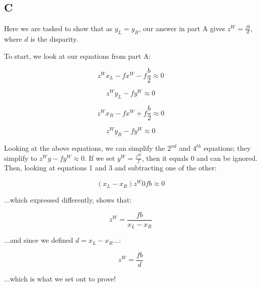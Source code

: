 \documentclass{article}
\begin{document}
\subsection*{C}

Here we are tasked to show that as $y_L=y_R$, our answer in part A gives $z^W=\frac{fb}{d}$, where $d$ is the disparity.

\noindent To start, we look at our equations from part A:

\begin{equation}
    z^W x_L - f x^W - f \frac{b}{2} \approx 0
\end{equation}

\begin{equation}
    z^W y_L - f y^W \approx 0
\end{equation}

\begin{equation}
    z^W x_R - f x^W + f \frac{b}{2} \approx 0
\end{equation}

\begin{equation}
    z^W y_R - f y^W \approx 0
\end{equation}

Looking at the above equations, we can simplify the $2^{nd}$ and $4^{th}$ equations; they simplify to $z^Wy - fy^W \approx 0$. If we set $y^W = \frac{z^W}{f}$, then it equals $0$ and can be ignored. Then, looking at equations 1 and 3 and subtracting one of the other:

\begin{equation}
    (x_L-x_R)z^W 0 fb \approx 0
\end{equation}

\noindent ...which expressed differently, shows that:

\begin{equation}
    z^W = \frac{fb}{x_L-x_R}
\end{equation}

\noindent ...and since we defined $d=x_L-x_R$...:

\begin{equation}
    z^W = \frac{fb}{d}
\end{equation}

\noindent ...which is what we set out to prove!
\end{document}
